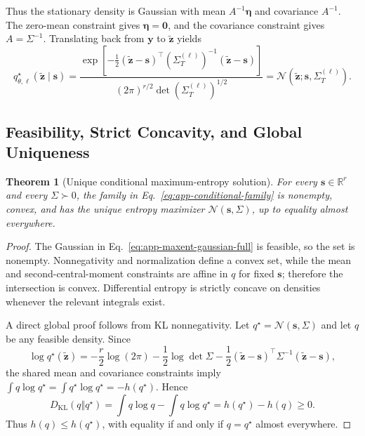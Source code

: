 \documentclass{article}
\newcommand{\R}{\mathbb{R}}
\newcommand{\calN}{\mathcal{N}}
\newcommand{\KL}{\mathrm{KL}}
\newcommand{\bs}{\boldsymbol{s}}
\newcommand{\bz}{\boldsymbol{z}}
\newcommand{\by}{\boldsymbol{y}}
\newcommand{\bSigma}{\varSigma}
\theoremstyle{plain}
\newtheorem{theorem}{Theorem}
\theoremstyle{definition}
\theoremstyle{remark}
\begin{document}
Thus the stationary density is Gaussian with mean
$A^{-1}\boldsymbol\eta$ and covariance $A^{-1}$.  The zero-mean constraint gives
$\boldsymbol\eta=\boldsymbol 0$, and the covariance constraint gives
$A=\bSigma^{-1}$.  Translating back from $\by$ to $\widetilde{\bz}$ yields
\begin{equation}
  q_{\theta,\ell}^{\star}(\widetilde{\bz}\mid\bs)
  =\frac{\exp\!\left[-\tfrac12(\widetilde{\bz}-\bs)^\top
  (\bSigma_T^{(\ell)})^{-1}(\widetilde{\bz}-\bs)\right]}
  {(2\pi)^{r/2}\det(\bSigma_T^{(\ell)})^{1/2}}
  =\calN\!\left(\widetilde{\bz};\bs,\bSigma_T^{(\ell)}\right).
  \label{eq:app-maxent-gaussian-full}
\end{equation}

\subsection{Feasibility, Strict Concavity, and Global Uniqueness}
\label{app:maxent-uniqueness}

\begin{theorem}[Unique conditional maximum-entropy solution]
\label{thm:app-maxent-unique}
For every $\bs\in\R^r$ and every $\bSigma\succ0$, the family in
Eq.~\eqref{eq:app-conditional-family} is nonempty, convex, and has the unique
entropy maximizer $\calN(\bs,\bSigma)$, up to equality almost everywhere.
\end{theorem}

\begin{proof}
The Gaussian in Eq.~\eqref{eq:app-maxent-gaussian-full} is feasible, so the set is
nonempty.  Nonnegativity and normalization define a convex set, while the mean and
second-central-moment constraints are affine in $q$ for fixed $\bs$; therefore the
intersection is convex.  Differential entropy is strictly concave on densities
whenever the relevant integrals exist.

A direct global proof follows from KL nonnegativity.  Let
$q^\star=\calN(\bs,\bSigma)$ and let $q$ be any feasible density.  Since
\begin{equation}
  \log q^\star(\widetilde{\bz})
  =-\frac r2\log(2\pi)-\frac12\log\det\bSigma
  -\frac12(\widetilde{\bz}-\bs)^\top\bSigma^{-1}(\widetilde{\bz}-\bs),
  \label{eq:app-log-qstar}
\end{equation}
the shared mean and covariance constraints imply
$\int q\log q^\star=\int q^\star\log q^\star=-h(q^\star)$.  Hence
\begin{equation}
  D_{\KL}(q\Vert q^\star)
  =\int q\log q-\int q\log q^\star
  =h(q^\star)-h(q)\ge0.
  \label{eq:app-kl-entropy-gap}
\end{equation}
Thus $h(q)\le h(q^\star)$, with equality if and only if
$q=q^\star$ almost everywhere.
\end{proof}
\end{document}
